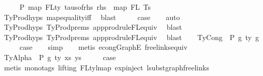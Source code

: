 \begin{isabellebody}
\ \ \isamarkupfalse%
\ \isamarkupfalse%
\ P{}{\isacharcolon}{\kern0pt}\ {\isachardoublequoteopen}map\ FLty\ {\isacharparenleft}{\kern0pt}taus{\isacharunderscore}{\kern0pt}of{\isacharunderscore}{\kern0pt}rhs\ rhs{\isacharparenright}{\kern0pt}\ {\isacharequal}{\kern0pt}\ map\ FL\ Ts{\isachardoublequoteclose}\isanewline
\ \ \ \ \isamarkupfalse%
\ TyProd{\isachardot}{\kern0pt}hyps{\isacharparenleft}{\kern0pt}{}{\isacharcomma}{\kern0pt}{}{\isacharparenright}{\kern0pt}\ map{\isacharunderscore}{\kern0pt}equality{\isacharunderscore}{\kern0pt}iff\ \isamarkupfalse%
\ blast\isanewline
\ \ \isamarkupfalse%
\ \isamarkupfalse%
\ {\isacharquery}{\kern0pt}case\isanewline
\ \ \isamarkupfalse%
\ auto\isanewline
\ \ \ \isamarkupfalse%
\ TyProd{\isachardot}{\kern0pt}hyps{\isacharparenleft}{\kern0pt}{}{\isacharparenright}{\kern0pt}\ TyProd{\isachardot}{\kern0pt}prems\ app{\isacharunderscore}{\kern0pt}prodrule{\isacharunderscore}{\kern0pt}FL{\isacharunderscore}{\kern0pt}equiv\ \isamarkupfalse%
\ blast\isanewline
\ \ \ \isamarkupfalse%
\ TyProd{\isachardot}{\kern0pt}hyps{\isacharparenleft}{\kern0pt}{}{\isacharparenright}{\kern0pt}\ TyProd{\isachardot}{\kern0pt}prems\ app{\isacharunderscore}{\kern0pt}prodrule{\isacharunderscore}{\kern0pt}FL{\isacharunderscore}{\kern0pt}equiv\ \isamarkupfalse%
\ blast\isanewline
{}\isamarkupfalse%
\isanewline
\ \ \isamarkupfalse%
\ {\isacharparenleft}{\kern0pt}TyCong\ {\isasymGamma}\ P\ g{}\ ty\ g{}{\isacharparenright}{\kern0pt}\isanewline
\ \ \isamarkupfalse%
\ \isamarkupfalse%
\ {\isacharquery}{\kern0pt}case\isanewline
\ \ \isamarkupfalse%
\ simp\isanewline
\ \ \isamarkupfalse%
\ {\isacharparenleft}{\kern0pt}metis\ econg{\isacharunderscore}{\kern0pt}GraphE\ freelinks{\isacharunderscore}{\kern0pt}equiv{\isacharparenright}{\kern0pt}\isanewline
{}\isamarkupfalse%
\isanewline
\ \ \isamarkupfalse%
\ {\isacharparenleft}{\kern0pt}TyAlpha\ {\isasymGamma}{}\ P\ g\ ty\ xs\ ys{\isacharparenright}{\kern0pt}\isanewline
\ \ \isamarkupfalse%
\ \isamarkupfalse%
\ {\isacharquery}{\kern0pt}case\isanewline
\ \ \isamarkupfalse%
\ {\isacharparenleft}{\kern0pt}metis\ {\isacharparenleft}{\kern0pt}mono{\isacharunderscore}{\kern0pt}tags{\isacharcomma}{\kern0pt}\ lifting{\isacharparenright}{\kern0pt}\ FL{\isacharunderscore}{\kern0pt}ty{\isacharunderscore}{\kern0pt}lmap\ exp{\isachardot}{\kern0pt}inject{\isacharparenleft}{\kern0pt}{}{\isacharparenright}{\kern0pt}\ lsubst{\isacharunderscore}{\kern0pt}graph{\isacharunderscore}{\kern0pt}freelinks{\isacharparenright}{\kern0pt}\isanewline

\end{isabellebody}
